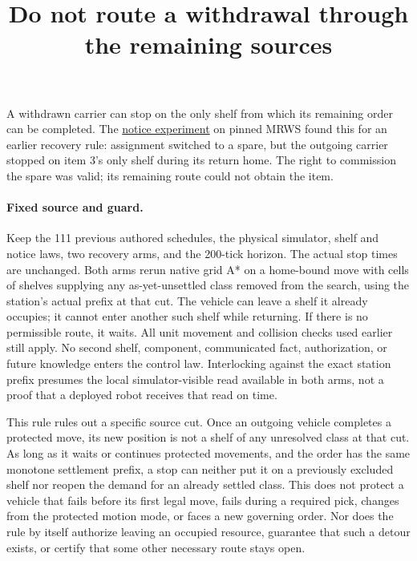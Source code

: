 \documentclass[11pt]{article}
\title{Do not route a withdrawal through the remaining sources}
\date{}
\begin{document}
\maketitle

A withdrawn carrier can stop on the only shelf from which its remaining order can be completed. The \href{https://github.com/eternal-november/eos-research-programmes/pull/415}{notice experiment} on pinned MRWS found this for an earlier recovery rule: assignment switched to a spare, but the outgoing carrier stopped on item 3's only shelf during its return home. The right to commission the spare was valid; its remaining route could not obtain the item.

\paragraph{Fixed source and guard.}
Keep the 111 previous authored schedules, the physical simulator, shelf and notice laws, two recovery arms, and the 200-tick horizon. The actual stop times are unchanged. Both arms rerun native grid A* on a home-bound move with cells of shelves supplying any as-yet-unsettled class removed from the search, using the station's actual prefix at that cut. The vehicle can leave a shelf it already occupies; it cannot enter another such shelf while returning. If there is no permissible route, it waits. All unit movement and collision checks used earlier still apply. No second shelf, component, communicated fact, authorization, or future knowledge enters the control law. Interlocking against the exact station prefix presumes the local simulator-visible read available in both arms, not a proof that a deployed robot receives that read on time.

This rule rules out a specific source cut. Once an outgoing vehicle completes a protected move, its new position is not a shelf of any unresolved class at that cut. As long as it waits or continues protected movements, and the order has the same monotone settlement prefix, a stop can neither put it on a previously excluded shelf nor reopen the demand for an already settled class. This does not protect a vehicle that fails before its first legal move, fails during a required pick, changes from the protected motion mode, or faces a new governing order. Nor does the rule by itself authorize leaving an occupied resource, guarantee that such a detour exists, or certify that some other necessary route stays open.
\end{document}
